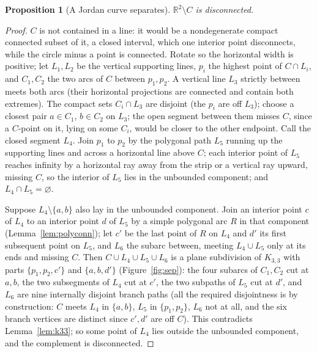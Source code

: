 \documentclass[11pt,a4paper]{article}
\theoremstyle{jsplain}
\newtheorem{proposition}[theorem]{Proposition}
\theoremstyle{jsdefn}
\begin{document}
\begin{proposition}[A Jordan curve separates]\label{prop:sep}
$\mathbb R^2\setminus C$ is disconnected.
\end{proposition}
\begin{proof}
$C$ is not contained in a line: it would be a nondegenerate compact
connected subset of it, a closed interval, which one interior point
disconnects, while the circle minus a point is connected. Rotate so
the horizontal width is positive; let $L_1,L_2$ be the vertical
supporting lines, $p_i$ the highest point of $C\cap L_i$, and
$C_1,C_2$ the two arcs of $C$ between $p_1,p_2$. A vertical line
$L_3$ strictly between meets both arcs (their horizontal projections
are connected and contain both extremes). The compact sets
$C_i\cap L_3$ are disjoint (the $p_i$ are off $L_3$); choose a closest
pair $a\in C_1$, $b\in C_2$ on $L_3$; the open segment between them
misses $C$, since a $C$-point on it, lying on some $C_i$, would be
closer to the other endpoint. Call the closed segment $L_4$. Join
$p_1$ to $p_2$ by the polygonal path $L_5$ running up the supporting
lines and across a horizontal line above $C$; each interior point of
$L_5$ reaches infinity by a horizontal ray away from the strip or a
vertical ray upward, missing $C$, so the interior of $L_5$ lies in the
unbounded component; and $L_4\cap L_5=\varnothing$.

Suppose $L_4\setminus\{a,b\}$ also lay in the unbounded component.
Join an interior point $c$ of $L_4$ to an interior point $d$ of $L_5$
by a simple polygonal arc $R$ in that component
(Lemma~\ref{lem:polyconn}); let $c'$ be the last point of $R$ on
$L_4$ and $d'$ its first subsequent point on $L_5$, and $L_6$ the
subarc between, meeting $L_4\cup L_5$ only at its ends and missing
$C$. Then $C\cup L_4\cup L_5\cup L_6$ is a plane subdivision of
$K_{3,3}$ with parts $\{p_1,p_2,c'\}$ and $\{a,b,d'\}$
(Figure~\ref{fig:sep}): the four
subarcs of $C_1,C_2$ cut at $a,b$, the two subsegments of $L_4$ cut at
$c'$, the two subpaths of $L_5$ cut at $d'$, and $L_6$ are nine
internally disjoint branch paths (all the required disjointness is by
construction: $C$ meets $L_4$ in $\{a,b\}$, $L_5$ in $\{p_1,p_2\}$,
$L_6$ not at all, and the six branch vertices are distinct since
$c',d'$ are off $C$). This contradicts Lemma~\ref{lem:k33}; so some
point of $L_4$ lies outside the unbounded component, and the
complement is disconnected.
\end{proof}
\end{document}

